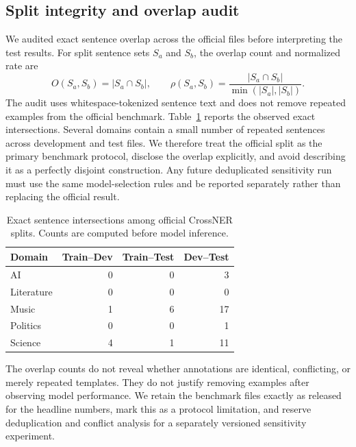 \documentclass[a4paper,fleqn,numbers,doubleblind]{cas-dc}
\begin{document}
\subsection{Split integrity and overlap audit}
We audited exact sentence overlap across the official files before interpreting the test results. For split sentence sets $S_a$ and $S_b$, the overlap count and normalized rate are
\begin{equation}
O(S_a,S_b)=|S_a\cap S_b|,\qquad
\rho(S_a,S_b)=\frac{|S_a\cap S_b|}{\min(|S_a|,|S_b|)}.
\end{equation}
The audit uses whitespace-tokenized sentence text and does not remove repeated examples from the official benchmark. Table~\ref{tab:overlap} reports the observed exact intersections. Several domains contain a small number of repeated sentences across development and test files. We therefore treat the official split as the primary benchmark protocol, disclose the overlap explicitly, and avoid describing it as a perfectly disjoint construction. Any future deduplicated sensitivity run must use the same model-selection rules and be reported separately rather than replacing the official result.

\begin{table}[t]
\centering
\caption{Exact sentence intersections among official CrossNER splits. Counts are computed before model inference.}
\label{tab:overlap}
\begin{tabular}{lrrr}
\toprule
Domain & Train--Dev & Train--Test & Dev--Test\\
\midrule
AI & 0 & 0 & 3\\
Literature & 0 & 0 & 0\\
Music & 1 & 6 & 17\\
Politics & 0 & 0 & 1\\
Science & 4 & 1 & 11\\
\bottomrule
\end{tabular}
\end{table}

The overlap counts do not reveal whether annotations are identical, conflicting, or merely repeated templates. They do not justify removing examples after observing model performance. We retain the benchmark files exactly as released for the headline numbers, mark this as a protocol limitation, and reserve deduplication and conflict analysis for a separately versioned sensitivity experiment.
\end{document}
